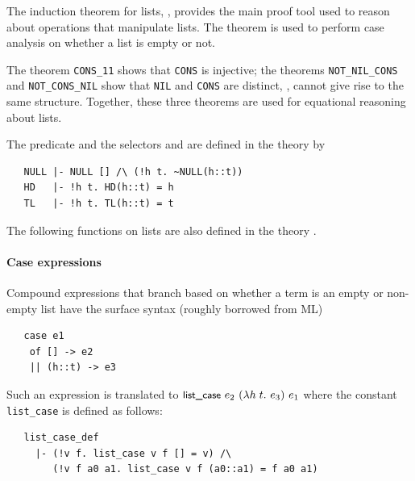 The induction theorem for lists, , provides the main
proof tool used to reason about operations that manipulate lists. The
theorem  is used to perform case analysis on whether a
list is empty or not.

The theorem {\small\verb+CONS_11+} shows that {\small\verb+CONS+} is injective;
the theorems {\small\verb+NOT_NIL_CONS+} and {\small\verb+NOT_CONS_NIL+} show that
{\small\verb+NIL+} and {\small\verb+CONS+} are distinct, \ie,
cannot give rise to the same structure. Together, these three theorems
are used for equational reasoning about lists.

The predicate  and the selectors
%
%
 and  are defined in the theory  by
%
\begin{hol}
\begin{verbatim}
   NULL |- NULL [] /\ (!h t. ~NULL(h::t))
   HD   |- !h t. HD(h::t) = h
   TL   |- !h t. TL(h::t) = t
\end{verbatim}
\end{hol}

\noindent The following functions on lists are also defined in the theory .
%
%
\paragraph{Case expressions}

Compound \HOL{} expressions that branch based on whether a term is an
empty or non-empty list have the surface syntax (roughly borrowed from
ML)
\begin{hol}
\begin{verbatim}
   case e1
    of [] -> e2
    || (h::t) -> e3
\end{verbatim}
\end{hol}
%
Such an expression is translated to
$\konst{list\_case}\ e_2\ (\lambda h\; t.\ e_3)\ e_1$ where the constant
{\small\verb+list_case+} is defined as follows:
\begin{hol}
\begin{verbatim}
   list_case_def
     |- (!v f. list_case v f [] = v) /\
        (!v f a0 a1. list_case v f (a0::a1) = f a0 a1)
\end{verbatim}
\end{hol}

